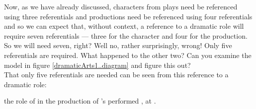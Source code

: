 Now, as we have already discussed, characters from plays need be referenced using three referentials
and productions need be referenced using four referentials 
and so we can expect that, without context, a reference to
a dramatic role will require seven referentials
 --- three for the character and four for the production. 
So we will need seven, right?
 Well no, rather surprisingly, wrong! Only five referentials are required. 
 What happened to the other two? Can you examine the model in figure \ref{dramaticArts1..diagram} and figure this out?
\begin{equation*}

\end{equation*}
That only five referentials are needed can be seen from this reference to a dramatic role:
\begin{erquote}
\parbox{9.0cm}{the role of  in the production of \mbox{'s}  performed \mbox{,} at .
}
\end{erquote}

